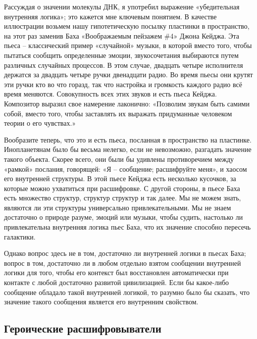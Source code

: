 \documentclass[../main.tex]{subfiles}
\begin{document}
Рассуждая о значении молекулы ДНК, я употребил выражение «убедительная внутренняя логика»; это кажется мне ключевым понятием. В качестве иллюстрации возьмем нашу гипотетическую посылку пластинки в пространство, на этот раз заменив Баха «Воображаемым пейзажем \#4» Джона Кейджа. Эта пьеса \--- классический пример «случайной» музыки, в которой вместо того, чтобы пытаться сообщить определенные эмоции, звукосочетания выбираются путем различных случайных процессов. В этом случае, двадцать четыре исполнителя держатся за двадцать четыре ручки двенадцати радио. Во время пьесы они крутят эти ручки кто во что горазд, так что настройка и громкость каждого радио всё время меняются. Совокупность всех этих звуков и есть пьеса Кейджа. Композитор выразил свое намерение лаконично: «Позволим звукам быть самими собой, вместо того, чтобы заставлять их выражать придуманные человеком теории о его чувствах.»

Вообразите теперь, что это и есть пьеса, посланная в пространство на пластинке. Инопланетянам было бы весьма нелегко, если не невозможно, разгадать значение такого объекта. Скорее всего, они были бы удивлены противоречием между «рамкой» послания, говорящей: «Я \--- сообщение; расшифруйте меня», и хаосом его внутренней структуры. В этой пьесе Кейджа есть несколько кусочков, за которые можно ухватиться при расшифровке. С другой стороны, в пьесе Баха есть множество структур, структур структур и так далее. Мы не можем знать, являются ли эти структуры универсально привлекательными. Мы не знаем достаточно о природе разуме, эмоций или музыки, чтобы судить, настолько ли привлекательна внутренняя логика пьес Баха, что их значение способно пересечь галактики.

Однако вопрос здесь не в том, достаточно ли внутренней логики в пьесах Баха; вопрос в том, достаточно ли в любом отдельно взятом сообщении внутренней логики для того, чтобы его контекст был восстановлен автоматически при контакте с любой достаточно развитой цивилизацией. Если бы какое-либо сообщение обладало такой внутренней логикой, то разумно было бы сказать, что значение такого сообщения является его внутренним свойством.


\subsection{Героические расшифровыватели}
\end{document}
